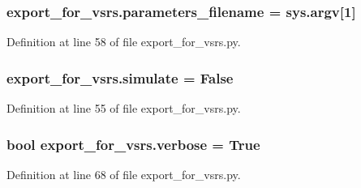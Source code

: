 \subsubsection[{\texorpdfstring{parameters\+\_\+filename}{parameters_filename}}]{\setlength{\rightskip}{0pt plus 5cm}export\+\_\+for\+\_\+vsrs.\+parameters\+\_\+filename = sys.\+argv\mbox{[}1\mbox{]}}\hypertarget{namespaceexport__for__vsrs_ad5b2c5f784d97cc82af334e29a2d3b78}{}\label{namespaceexport__for__vsrs_ad5b2c5f784d97cc82af334e29a2d3b78}


Definition at line 58 of file export\+\_\+for\+\_\+vsrs.\+py.

\subsubsection[{\texorpdfstring{simulate}{simulate}}]{\setlength{\rightskip}{0pt plus 5cm}export\+\_\+for\+\_\+vsrs.\+simulate = False}\hypertarget{namespaceexport__for__vsrs_a553d224871aaf86fb6d6c63318f75d4f}{}\label{namespaceexport__for__vsrs_a553d224871aaf86fb6d6c63318f75d4f}


Definition at line 55 of file export\+\_\+for\+\_\+vsrs.\+py.

\subsubsection[{\texorpdfstring{verbose}{verbose}}]{\setlength{\rightskip}{0pt plus 5cm}bool export\+\_\+for\+\_\+vsrs.\+verbose = True}\hypertarget{namespaceexport__for__vsrs_a91f5948087e0712f96dad76a670673b0}{}\label{namespaceexport__for__vsrs_a91f5948087e0712f96dad76a670673b0}


Definition at line 68 of file export\+\_\+for\+\_\+vsrs.\+py.

